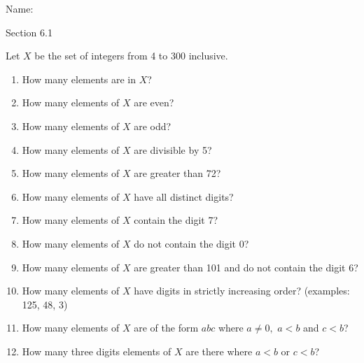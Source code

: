 \documentclass[12pt]{article}
\def\bc{\begin{center}}
\def\ec{\end{center}}
\newcommand{\be}{\begin{enumerate}}
\newcommand{\ee}{\end{enumerate}}
\begin{document}
\thispagestyle{fancy}

\quad
Name: \\

\quad
\bc Section 6.1 \ec

Let $X$ be the set of integers from 4 to 300 inclusive.
\be
\item How many elements are in $X$?
\vfill
\item How many elements of $X$ are even?
\vfill
\item How many elements of $X$ are odd?
\vfill
\item How many elements of $X$ are divisible by 5?
\vfill
\item How many elements of $X$ are greater than 72?
\vfill

\item How many elements of $X$ have all distinct digits?
\vfill
\newpage
\item How many elements of $X$ contain the digit 7?
\vfill
\item How many elements of $X$ do not contain the digit 0?
\vfill
\item How many elements of $X$ are greater than 101 and do not contain the digit 6?
\vfill
\item How many elements of $X$ have digits in strictly increasing order? (examples: 125, 48, 3)
\vfill
\item How many elements of $X$ are of the form $abc$ where $a\not=0,$ $a<b$ and $c<b$?
\vfill
\item How many three digits elements of $X$ are there  where  $a<b$ or $c<b$?
\vfill
\ee
\end{document}
